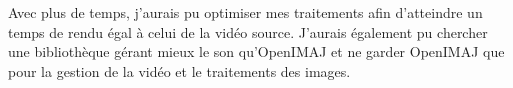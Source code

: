 \documentclass[10pt,a4paper]{article}
\begin{document}
Avec plus de temps, j'aurais pu optimiser mes traitements afin d'atteindre un temps de rendu égal à celui de la vidéo source. J'aurais également pu chercher une bibliothèque gérant mieux le son qu'OpenIMAJ et ne garder OpenIMAJ que pour la gestion de la vidéo et le traitements des images.





\newpage

\end{document}
